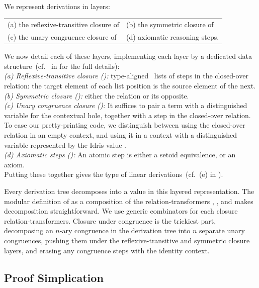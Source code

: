 We represent derivations in layers:
\begin{center}
  \begin{tabular}{@{}l@{\qquad}l@{}}
(a) the reflexive-transitive closure of &
(b) the symmetric closure of\\%
(c) the unary congruence closure of &
(d) axiomatic reasoning steps.
  \end{tabular}
\end{center}
We now detail each of these layers, implementing each layer by a
dedicated data structure~(cf.~ in
 for the full details):\\
\textit{(a) Reflexive-transitive closure ():}
type-aligned~\cite{DBLP:conf/haskell/PloegK14} lists of steps in
the closed-over relation: the target element of each list position
is the source element of the next.\\
\textit{(b) Symmetric closure ():}{ either the relation or its opposite}.\\
\textit{(c) Unary congruence closure ():} It suffices to pair a term
with a distinguished variable for the contextual hole, together with a
step in the closed-over relation. To ease our pretty-printing code,
we distinguish between using the closed-over relation in an empty
context, and using it in a context with a distinguished variable
represented by the Idris value .\\
\textit{(d) Axiomatic steps ():} An atomic step is either a setoid equivalence,
or an axiom.\\
Putting these together gives the type  of
linear derivations~(cf.~(e) in ).

Every derivation tree decomposes into a value in this layered
representation. The modular definition of  as a
composition of the relation-transformers ,
,  and  makes
decomposition straightforward.  We use generic combinators for each
closure relation-transformers. Closure under congruence is the
trickiest part, decomposing an $n$-ary congruence in the derivation tree
into $n$ separate
unary congruences, pushing them under the reflexive-transitive and
symmetric closure layers, and erasing any congruence steps with the
identity context.

\subsection{Proof Simplication}

